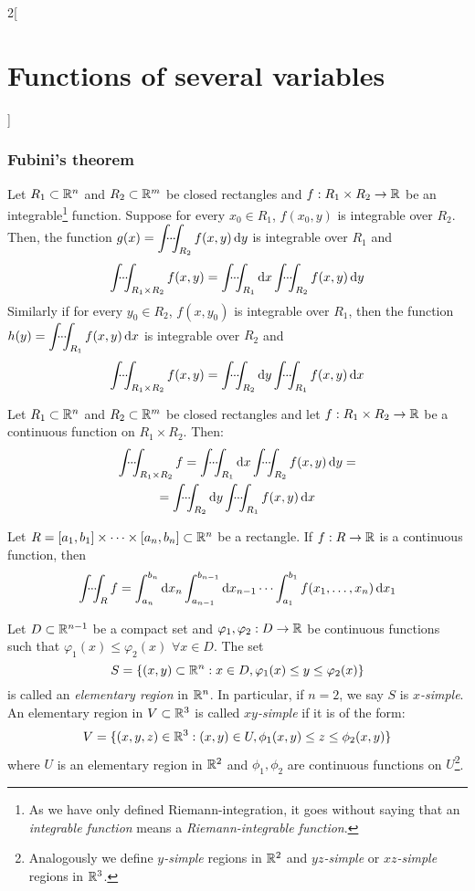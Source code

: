 \documentclass[../../../main_math.tex]{subfiles}
\begin{document}
\begin{multicols}{2}[\section{Functions of several variables}]
  \subsubsection{Fubini's theorem}
  \begin{theorem}
    Let $R_1\subset\mathbb{R}^n$ and $R_2\subset\mathbb{R}^m$ be closed rectangles and $f:R_1\times R_2\rightarrow\mathbb{R} $ be an integrable\footnote{As we have only defined Riemann-integration, it goes without saying that an \emph{integrable function} means a \emph{Riemann-integrable function}.} function. Suppose for every $x_0\in R_1$, $f(x_0,y)$ is integrable over $R_2$. Then, the function $\displaystyle g(x)=\dotsint_{R_2}f(x,y)\dd{y}$ is integrable over $R_1$ and $$\dotsint_{R_1\times R_2}f(x,y)=\dotsint_{R_1}\dd{x}\dotsint_{R_2}f(x,y)\dd{y}$$ Similarly if for every $y_0\in R_2$, $f(x,y_0)$ is integrable over $R_1$, then the function $\displaystyle h(y)=\dotsint_{R_1}f(x,y)\dd{x}$ is integrable over $R_2$ and $$\dotsint_{R_1\times R_2}f(x,y)=\dotsint_{R_2}\dd{y}\dotsint_{R_1}f(x,y)\dd{x}$$
    \begin{corollary}
      Let $R_1\subset\mathbb{R}^n$ and $R_2\subset\mathbb{R}^m$ be closed rectangles and let $f:R_1\times R_2\rightarrow\mathbb{R} $ be a continuous function on $R_1\times R_2$. Then: \begin{multline*}
        \dotsint_{R_1\times R_2}f=\dotsint_{R_1}\dd{x}\dotsint_{R_2}f(x,y)\dd{y}=\\=\dotsint_{R_2}\dd{y}\dotsint_{R_1}f(x,y)\dd{x}
      \end{multline*}
    \end{corollary}
    \begin{corollary}
      Let $R=[a_1,b_1]\times\cdots\times[a_n,b_n]\subset\mathbb{R}^n$ be a rectangle. If $f:R\rightarrow\mathbb{R} $ is a continuous function, then $$\dotsint_Rf=\int_{a_n}^{b_n}\dd{x_n}\int_{a_{n-1}}^{b_{n-1}}\dd{x_{n-1}}\cdots\int_{a_1}^{b_1}f(x_1,\ldots,x_n)\dd{x_1}$$
    \end{corollary}
    \begin{definition}
      Let $D\subset\mathbb{R}^{n-1}$ be a compact set and $\varphi_1,\varphi_2:D\rightarrow\mathbb{R} $ be continuous functions such that $\varphi_1(x)\leq\varphi_2(x)$ $\forall x\in D$. The set $$S=\{(x,y)\subset\mathbb{R}^n:x\in D, \varphi_1(x)\leq y\leq\varphi_2(x)\}$$ is called an \emph{elementary region} in $\mathbb{R}^n$. In particular, if $n=2$, we say $S$ is \emph{$x$-simple}. An elementary region in $V\subset\mathbb{R}^3$ is called \emph{$xy$-simple} if it is of the form: $$V=\{(x,y,z)\in\mathbb{R}^3:(x,y)\in U, \phi_1(x,y)\leq z\leq\phi_2(x,y)\}$$ where $U$ is an elementary region in $\mathbb{R}^2$ and $\phi_1,\phi_2$ are continuous functions on $U$\footnote{Analogously we define \emph{$y$-simple} regions in $\mathbb{R}^2$ and \emph{$yz$-simple} or \emph{$xz$-simple} regions in $\mathbb{R}^3$.}.

\end{definition}
\end{theorem}
\end{multicols}
\end{document}
